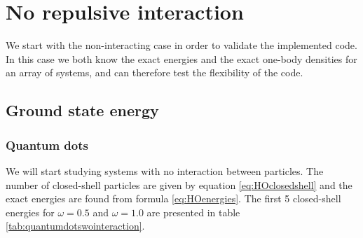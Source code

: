 \newpage
\section{No repulsive interaction}
We start with the non-interacting case in order to validate the implemented code. In this case we both know the exact energies and the exact one-body densities for an array of systems, and can therefore test the flexibility of the code. 

\subsection{Ground state energy}
\subsubsection{Quantum dots}
We will start studying systems with no interaction between particles. The number of closed-shell particles are given by equation \eqref{eq:HOclosedshell} and the exact energies are found from formula \eqref{eq:HOenergies}. The first 5 closed-shell energies for $\omega=0.5$ and $\omega=1.0$ are presented in table \eqref{tab:quantumdotswointeraction}.

